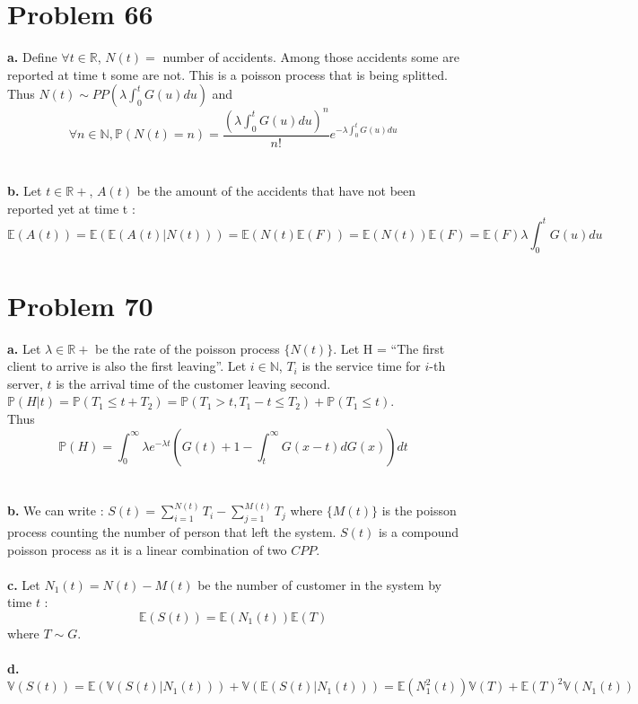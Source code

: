 \documentclass{article}
\begin{document}
\section*{Problem 66}
\textbf{a.} Define $\forall t \in\mathbb{R}$, $N(t) = $ number of accidents.
 Among those accidents some are reported at time t some are not.
 This is a poisson process that is being splitted.
 Thus $N(t)\sim PP(\lambda \int_0^tG(u)du)$ and $$\boxed{\forall n \in \mathbb{N}, \mathbb{P}(N(t) = n) = \dfrac{(\lambda \int_0^tG(u)du)^n}{n!}e^{-\lambda \int_0^tG(u)du}}$$
\\\\
\textbf{b.} Let $t\in\mathbb{R}+$, $A(t)$ be the amount of the accidents that have not been reported yet at time t :
 $$\boxed{\mathbb{E}(A(t)) = \mathbb{E}(\mathbb{E}(A(t)|N(t))) = \mathbb{E}(N(t)\mathbb{E}(F)) = \mathbb{E}(N(t))\mathbb{E}(F) = \mathbb{E}(F)\lambda \int_0^t G(u)du }$$

 \section*{Problem 70}
\textbf{a.} Let $\lambda \in \mathbb{R}+$ be the rate of the poisson process $\{N(t)\}$. Let H = ``The first client to arrive is also the first leaving''. Let $i\in\mathbb{N}$, $T_i$ is the service time for $i$-th server, $t$ is the arrival time of the customer leaving second.\\
 $\mathbb{P}(H|t) = \mathbb{P}(T_1\leq t + T_2) = \mathbb{P}(T_1>t, T_1-t\leq T_2)+\mathbb{P}(T_1\leq t)$.\\
Thus $$\boxed{\mathbb{P}(H) = \int_0^{\infty}\lambda e^{-\lambda t}\left(G(t)+1-\int_t^{\infty}G(x-t)dG(x)\right)dt}$$
\\\\
\textbf{b.} We can write : $S(t) = \sum\limits_{i=1}^{N(t)}T_i - \sum\limits_{j=1}^{M(t)} T_j$ where $\{M(t)\}$ is the poisson process counting the number of person that left the system. $S(t)$ is a compound poisson process as it is a linear combination of two $CPP$.
\\\\
\textbf{c.} Let $N_1(t) = N(t)-M(t)$ be the number of customer in the system by time $t$ : $$\boxed{\mathbb{E}(S(t)) = \mathbb{E}(N_1(t))\mathbb{E}(T)}$$ where $T\sim G$.
\\\\
\textbf{d.} $$\boxed{\mathbb{V}(S(t)) = \mathbb{E}(\mathbb{V}(S(t)|N_1(t)))+\mathbb{V}(\mathbb{E}(S(t)|N_1(t))) = \mathbb{E}(N_1^2(t))\mathbb{V}(T)+\mathbb{E}(T)^2\mathbb{V}(N_1(t))}$$
\end{document}
